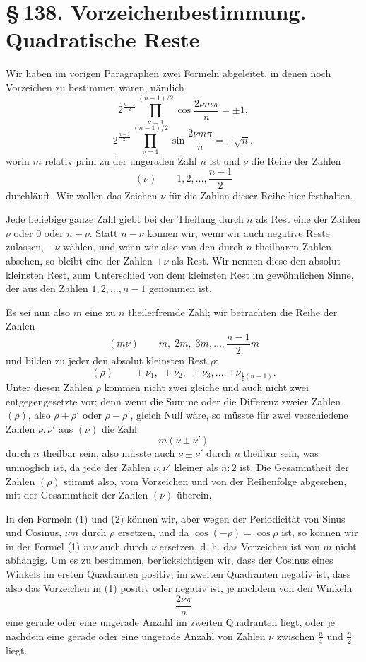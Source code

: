 \documentclass[11pt]{article}
\providecommand{\sect}[2]{\section*{\S\,#1. #2}}
\begin{document}
\sect{138}{Vorzeichenbestimmung. Quadratische Reste}

Wir haben im vorigen Paragraphen zwei Formeln abgeleitet, in denen noch Vorzeichen zu bestimmen waren, nämlich
\[
\tag{1}
2^{\frac{n-1}{2}}\prod_{\nu=1}^{(n-1)/2}\cos\frac{2\nu m\pi}{n}=\pm1,
\]
\[
\tag{2}
2^{\frac{n-1}{2}}\prod_{\nu=1}^{(n-1)/2}\sin\frac{2\nu m\pi}{n}=\pm\sqrt n,
\]
worin $m$ relativ prim zu der ungeraden Zahl $n$ ist und $\nu$ die Reihe der Zahlen
\[
(\nu)\qquad 1,2,\ldots,\frac{n-1}{2}
\]
durchläuft. Wir wollen das Zeichen $\nu$ für die Zahlen dieser Reihe hier festhalten.

Jede beliebige ganze Zahl giebt bei der Theilung durch $n$ als Rest eine der Zahlen $\nu$ oder $0$ oder $n-\nu$. Statt $n-\nu$ können wir, wenn wir auch negative Reste zulassen, $-\nu$ wählen, und wenn wir also von den durch $n$ theilbaren Zahlen absehen, so bleibt eine der Zahlen $\pm\nu$ als Rest. Wir nennen diese den absolut kleinsten Rest, zum Unterschied von dem kleinsten Rest im gewöhnlichen Sinne, der aus den Zahlen $1,2,\ldots,n-1$ genommen ist.

Es sei nun also $m$ eine zu $n$ theilerfremde Zahl; wir betrachten die Reihe der Zahlen
\[
(m\nu)\qquad m,\;2m,\;3m,\ldots,\frac{n-1}{2}m
\]
und bilden zu jeder den absolut kleinsten Rest $\rho$:
\[
(\rho)\qquad \pm\nu_1,\;\pm\nu_2,\;\pm\nu_3,\ldots,
       \pm\nu_{\frac12(n-1)}.
\]
Unter diesen Zahlen $\rho$ kommen nicht zwei gleiche und auch nicht zwei entgegengesetzte vor; denn wenn die Summe oder die Differenz zweier Zahlen $(\rho)$, also $\rho+\rho'$ oder $\rho-\rho'$, gleich Null wäre, so müsste für zwei verschiedene Zahlen $\nu,\nu'$ aus $(\nu)$ die Zahl
\[
        m(\nu\pm\nu')
\]
durch $n$ theilbar sein, also müsste auch $\nu\pm\nu'$ durch $n$ theilbar sein, was unmöglich ist, da jede der Zahlen $\nu,\nu'$ kleiner als $n:2$ ist. Die Gesammtheit der Zahlen $(\rho)$ stimmt also, vom Vorzeichen und von der Reihenfolge abgesehen, mit der Gesammtheit der Zahlen $(\nu)$ überein.

In den Formeln (1) und (2) können wir, aber wegen der Periodicität von Sinus und Cosinus, $\nu m$ durch $\rho$ ersetzen, und da $\cos(-\rho)=\cos\rho$ ist, so können wir in der Formel (1) $m\nu$ auch durch $\nu$ ersetzen, d. h. das Vorzeichen ist von $m$ nicht abhängig. Um es zu bestimmen, berücksichtigen wir, dass der Cosinus eines Winkels im ersten Quadranten positiv, im zweiten Quadranten negativ ist, dass also das Vorzeichen in (1) positiv oder negativ ist, je nachdem von den Winkeln
\[
        \frac{2\nu\pi}{n}
\]
eine gerade oder eine ungerade Anzahl im zweiten Quadranten liegt, oder je nachdem eine gerade oder eine ungerade Anzahl von Zahlen $\nu$ zwischen $\frac n4$ und $\frac n2$ liegt.
\end{document}

